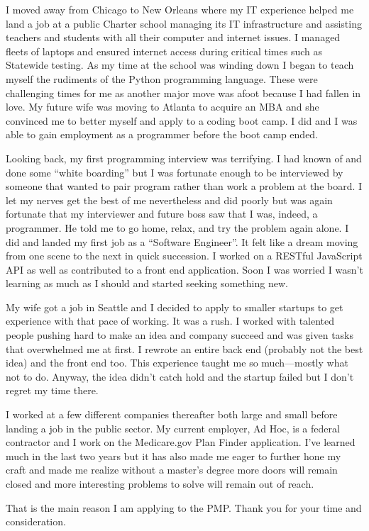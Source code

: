 \documentclass[12pt]{article}
\begin{document}
I moved away from Chicago to New Orleans where my IT experience helped me land a job at a public Charter school managing its IT infrastructure and assisting teachers and students with all their computer and internet issues. I managed fleets of laptops and ensured internet access during critical times such as Statewide testing. As my time at the school was winding down I began to teach myself the rudiments of the Python programming language. These were challenging times for me as another major move was afoot because I had fallen in love. My future wife was moving to Atlanta to acquire an MBA and she convinced me to better myself and apply to a coding boot camp. I did and I was able to gain employment as a programmer before the boot camp ended.

Looking back, my first programming interview was terrifying. I had known of and done some ``white boarding'' but I was fortunate enough to be interviewed by someone that wanted to pair program rather than work a problem at the board. I let my nerves get the best of me nevertheless and did poorly but was again fortunate that my interviewer and future boss saw that I was, indeed, a programmer. He told me to go home, relax, and try the problem again alone. I did and landed my first job as a ``Software Engineer''. It felt like a dream moving from one scene to the next in quick succession. I worked on a RESTful JavaScript API as well as contributed to a front end application. Soon I was worried I wasn't learning as much as I should and started seeking something new.

My wife got a job in Seattle and I decided to apply to smaller startups to get experience with that pace of working. It was a rush. I worked with talented people pushing hard to make an idea and company succeed and was given tasks that overwhelmed me at first. I rewrote an entire back end (probably not the best idea) and the front end too. This experience taught me so much---mostly what not to do. Anyway, the idea didn't catch hold and the startup failed but I don't regret my time there.

I worked at a few different companies thereafter both large and small before landing a job in the public sector. My current employer, Ad Hoc, is a federal contractor and I work on the Medicare.gov Plan Finder application. I've learned much in the last two years but it has also made me eager to further hone my craft and made me realize without a master's degree more doors will remain closed and more interesting problems to solve will remain out of reach.

That is the main reason I am applying to the PMP. Thank you for your time and consideration.
\end{document}
